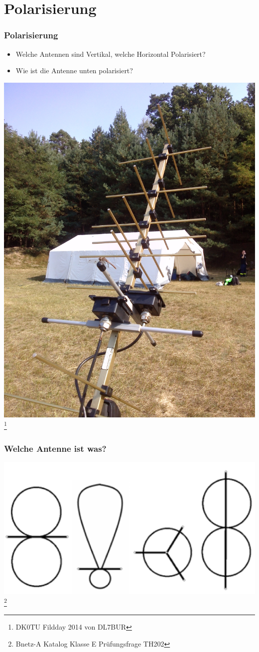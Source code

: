 \section*{Polarisierung}

\begin{frame}
    \frametitle{Polarisierung}
    	\begin{itemize}
		\item Welche Antennen sind Vertikal, welche Horizontal Polarisiert?
		\item Wie ist die Antenne unten polarisiert?
    \end{itemize}
    \begin{center}
        \includegraphics[width=.4\textwidth]{e11/kreutzYagi.jpg}
        \footnote{\tiny DK0TU Fildday 2014 von DL7BUR}
	\end{center}
\end{frame}

\begin{frame}
    \frametitle{Welche Antenne ist was?}
    \begin{center}
        \includegraphics[width=1\textwidth]{e11/Abstrahl.png}
        \footnote{\tiny Bnetz-A Katalog Klasse E Prüfungsfrage TH202 }
	\end{center}
\end{frame}


